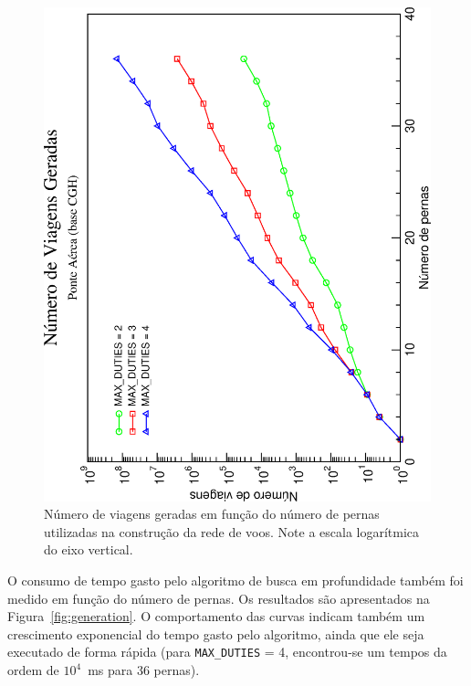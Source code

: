 \documentclass[12pt,a4paper]{article}
\begin{document}
\begin{figure}[htp]
	\begin{center}
		\includegraphics[scale=0.45,angle=-90]{fig/number_of_pairings.eps}
		\caption{Número de viagens geradas em função do número de pernas utilizadas na construção da
		rede de voos. Note a escala logarítmica do eixo vertical.}
		\label{fig:pairings}
	\end{center}
\end{figure}

O consumo de tempo gasto pelo algoritmo de busca em profundidade também foi medido em função do 
número de pernas. Os resultados são apresentados na Figura~\ref{fig:generation}. O comportamento das
curvas indicam também um crescimento exponencial do tempo gasto pelo algoritmo, ainda que ele seja
executado de forma rápida (para \verb|MAX_DUTIES| = 4, encontrou-se um tempos da ordem de $10^4$~ms 
para 36 pernas).
\end{document}
